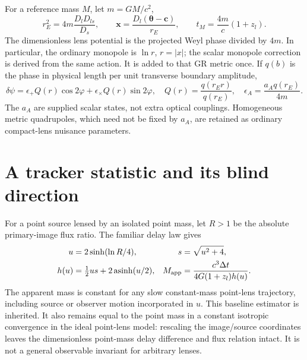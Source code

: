 \documentclass[11pt,a4paper]{article}
\newcommand{\asinh}{\operatorname{asinh}}
\begin{document}
For a reference mass $M$, let $m=GM/c^2$,
\begin{equation}
 r_E^2=4m\frac{D_lD_{ls}}{D_s},\qquad
 \boldsymbol x=\frac{D_l(\boldsymbol\theta-\boldsymbol c)}{r_E},\qquad
 t_M=\frac{4m}{c}(1+z_l).
\end{equation}
The dimensionless lens potential is the projected Weyl phase divided by
$4m$. In particular, the ordinary monopole is $\ln r$, $r=|x|$; the
scalar monopole correction is derived from the same action. It is added
to that GR metric once. If $q(b)$ is the phase in physical length per
unit transverse boundary amplitude,
\begin{equation}
 \delta\psi=\epsilon_+ Q(r)\cos2\varphi+
                   \epsilon_\times Q(r)\sin2\varphi,
 \quad Q(r)=\frac{q(r_Er)}{q(r_E)},\quad
 \epsilon_A=\frac{a_A q(r_E)}{4m}.
\label{eq:optical-normalization}
\end{equation}
The $a_A$ are supplied scalar states, not extra optical couplings.
Homogeneous metric quadrupoles, which need not be fixed by $a_A$, are
retained as ordinary compact-lens nuisance parameters.

\section{A tracker statistic and its blind direction}

For a point source lensed by an isolated point mass, let $R>1$ be the
absolute primary-image flux ratio. The familiar delay law
\cite{Munoz2016} gives
\begin{align}
 u&=2\sinh(\ln R/4),&s&=\sqrt{u^2+4},\notag\\
 h(u)&=\tfrac12us+2\asinh(u/2),&
 M_{\rm app}&=\frac{c^3\Delta t}{4G(1+z_l)h(u)}.
\label{eq:massstat}
\end{align}
The apparent mass is constant for any slow constant-mass point-lens
trajectory, including source or observer motion incorporated in $u$.
This baseline estimator is inherited. It also remains equal to the point
mass in a constant isotropic convergence in the ideal point-lens model:
rescaling the image/source coordinates leaves the dimensionless
point-mass delay difference and flux relation intact. It is not a general
observable invariant for arbitrary lenses.
\end{document}
